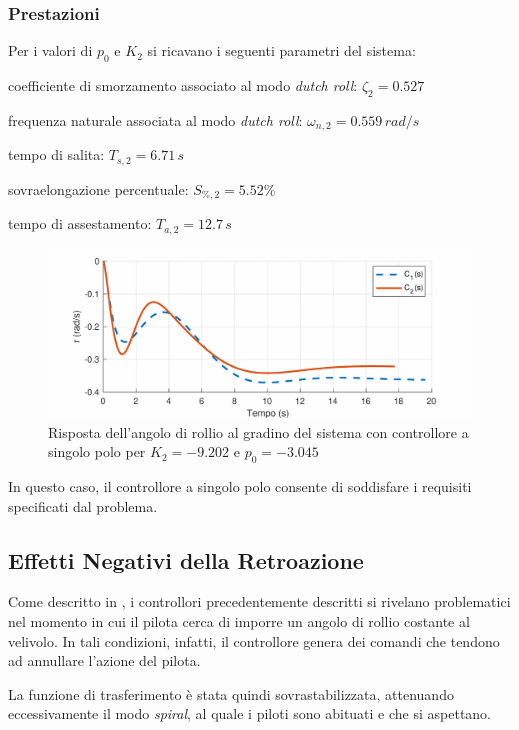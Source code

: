 \subsubsection{Prestazioni}
Per i valori di $p_0$ e $K_2$ si ricavano i seguenti parametri del sistema:
\begin{sitemize}
    \item coefficiente di smorzamento associato al modo \textit{dutch roll}: $\zeta_2 = 0.527$
    \item frequenza naturale associata al modo \textit{dutch roll}: $\omega_{n, 2} = 0.559 \, rad/s$
    \item tempo di salita: $T_{s, 2} = 6.71 \, s$
    \item sovraelongazione percentuale: $S_{\%, 2} = 5.52\%$
    \item tempo di assestamento: $T_{a, 2} = 12.7 \, s$
\end{sitemize}

\begin{figure}[H]
    \centering
    \includegraphics[width=0.7\linewidth]{Immagini/pole_step_lateral.pdf}
    \caption{Risposta dell'angolo di rollio al gradino del sistema con controllore a singolo polo per $K_2 = -9.202$ e $p_0 = -3.045$}
\end{figure}

In questo caso, il controllore a singolo polo consente di soddisfare i requisiti specificati dal problema.

\subsection{Effetti Negativi della Retroazione}

Come descritto in \cite{mathworks_yaw_damper}, i controllori precedentemente descritti si rivelano problematici nel momento in cui il pilota cerca di imporre un angolo di rollio costante al velivolo. In tali condizioni, infatti, il controllore genera dei comandi che tendono ad annullare l'azione del pilota.

La funzione di trasferimento è stata quindi sovrastabilizzata, attenuando eccessivamente il modo \textit{spiral}, al quale i piloti sono abituati e che si aspettano.

